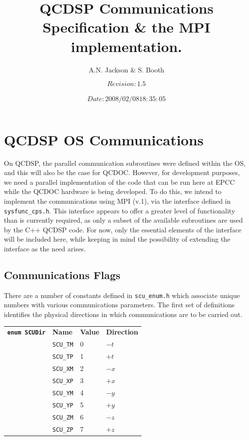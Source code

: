 \documentclass[12pt]{article}
\title{QCDSP Communications Specification \& the MPI implementation.}
\author{A.N. Jackson \& S. Booth}
\date{\mbox{\small $$Revision: 1.5 $$  $$Date: 2008/02/08 18:35:05 $$}}
\newcommand{\cde}[1]{{\tt #1}}            %
\begin{document}
\maketitle

\tableofcontents
\newpage

\section{QCDSP OS Communications}
On QCDSP, the parallel communication subroutines were defined within
the OS, and this will also be the case for QCDOC.  However, for
development purposes, we need a parallel implementation of the code
that can be run here at EPCC while the QCDOC hardware is being
developed.  To do this, we intend to implement the communications
using MPI (v.1), via the interface defined in \cde{sysfunc_cps.h}.  This
interface appears to offer a greater level of functionality than is
currently required, as only a subset of the available subroutines are
used by the C++ QCDSP code.  For now, only the essential elements of
the interface will be included here, while keeping in mind the
possibility of extending the interface as the need arises.

\subsection{Communications Flags}
\label{col:comm:flags}
There are a number of constants defined in \cde{scu\_enum.h} which
associate unique numbers with various communications parameters.  The
first set of definitions identifies the physical directions in which
communications are to be carried out.

\begin{tabular}{llll}
\cde{{\bf enum SCUDir}} & {\bf Name} & {\bf Value} & {\bf Direction} \\
                        &\cde{SCU\_\-TM} & 0 & $-t$\\
                        &\cde{SCU\_\-TP} & 1 & $+t$\\
                        &\cde{SCU\_\-XM} & 2 & $-x$\\
                        &\cde{SCU\_\-XP} & 3 & $+x$\\
                        &\cde{SCU\_\-YM} & 4 & $-y$\\
                        &\cde{SCU\_\-YP} & 5 & $+y$\\
                        &\cde{SCU\_\-ZM} & 6 & $-z$\\
                        &\cde{SCU\_\-ZP} & 7 & $+z$
\end{tabular}
\end{document}

